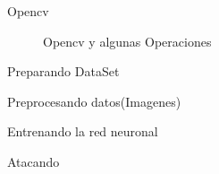 \documentclass[12pt]{beamer}
\begin{document}
\begin{frame}{Opencv}

\begin{figure}[H]
\centering
{}
\caption{Opencv y algunas Operaciones}
\end{figure}

\end{frame}

\begin{frame}{Preparando DataSet}

\end{frame}

\begin{frame}{Preprocesando datos(Imagenes)}

\end{frame}

\begin{frame}{Entrenando la red neuronal}

\end{frame}

\begin{frame}{Atacando}

\end{frame}
\end{document}
